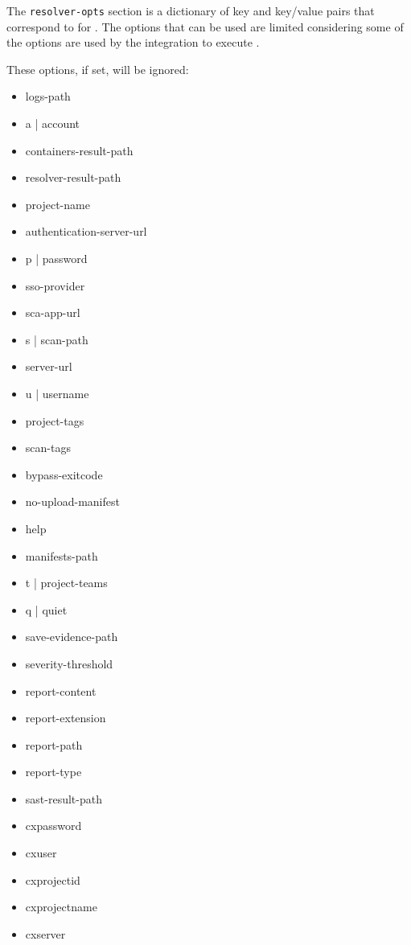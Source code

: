 The \texttt{resolver-opts} section is a dictionary of key and key/value pairs that correspond to
 for \scaresolver.
The options that can be used are limited considering some of the options are used by the \cxoneflow integration to execute \scaresolver.

These options, if set, will be ignored:

\begin{itemize}
  \item logs-path
  \item a | account
  \item containers-result-path
  \item resolver-result-path
  \item project-name
  \item authentication-server-url
  \item p | password
  \item sso-provider
  \item sca-app-url
  \item s | scan-path
  \item server-url
  \item u | username
  \item project-tags
  \item scan-tags
  \item bypass-exitcode
  \item no-upload-manifest
  \item help
  \item manifests-path
  \item t | project-teams
  \item q | quiet
  \item save-evidence-path
  \item severity-threshold
  \item report-content
  \item report-extension
  \item report-path
  \item report-type
  \item sast-result-path
  \item cxpassword
  \item cxuser
  \item cxprojectid
  \item cxprojectname
  \item cxserver
\end{itemize}

